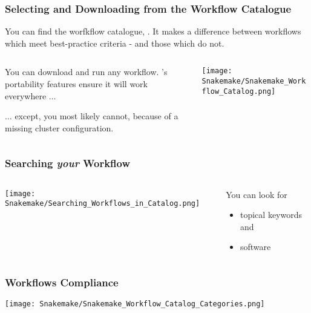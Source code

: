 \begin{frame}
 \frametitle{Selecting and Downloading from the Workflow Catalogue}
 You can find the \Snakemake{} worfkflow catalogue, . It makes a difference between workflows which meet best-practice criteria - and those which do not.\newline
 \begin{columns}
   \begin{column}{0.5\textwidth}
     You can download and run any workflow. \Snakemake's portability features ensure it will work everywhere $\ldots$\pause
     \begin{warning}
     	$\ldots$ except, you most likely cannot, because of a missing cluster configuration.
     \end{warning}
   \end{column}
   \begin{column}{0.5\textwidth}
     \texttt{[image: Snakemake/Snakemake\_Workflow\_Catalog.png]}
   \end{column}
 \end{columns}
\end{frame}

\begin{frame}
  \frametitle{Searching \emph{your} Workflow}
   \begin{columns}
  	\begin{column}{0.5\textwidth}
  		\texttt{[image: Snakemake/Searching\_Workflows\_in\_Catalog.png]}
  	\end{column}
  	\begin{column}{0.5\textwidth}
  		You can look for 
  		\begin{itemize}
  		  \item topical keywords and
  		  \item software
  		\end{itemize}
  	\end{column}
  \end{columns}
\end{frame}

\begin{frame}
	\frametitle{Workflows Compliance}
	\begin{question}
	  \texttt{[image: Snakemake/Snakemake\_Workflow\_Catalog\_Categories.png]}
	\end{question}
\end{frame}

